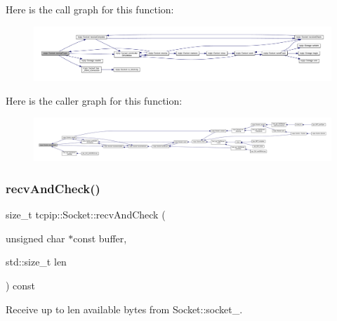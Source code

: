 Here is the call graph for this function\+:
\nopagebreak
\begin{figure}[H]
\begin{center}
\leavevmode
\includegraphics[width=350pt]{classtcpip_1_1_socket_a0d00337ac1fbad2cf183f0a651539e2e_cgraph}
\end{center}
\end{figure}
Here is the caller graph for this function\+:
\nopagebreak
\begin{figure}[H]
\begin{center}
\leavevmode
\includegraphics[width=350pt]{classtcpip_1_1_socket_a0d00337ac1fbad2cf183f0a651539e2e_icgraph}
\end{center}
\end{figure}
\mbox{\label{classtcpip_1_1_socket_a30a24c05b20d9c3ec54239e75268cda8}} 
\subsubsection{\texorpdfstring{recv\+And\+Check()}{recvAndCheck()}}
{\footnotesize\ttfamily size\+\_\+t tcpip\+::\+Socket\+::recv\+And\+Check (\begin{DoxyParamCaption}\item[{unsigned char $\ast$const}]{buffer,  }\item[{std\+::size\+\_\+t}]{len }\end{DoxyParamCaption}) const\hspace{0.3cm}{\ttfamily [protected]}}



Receive up to {\ttfamily len} available bytes from Socket\+::socket\+\_\+. 


